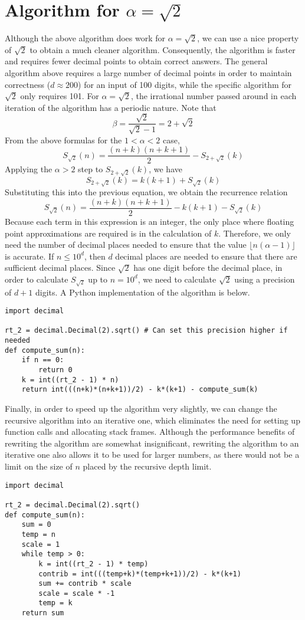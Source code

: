 \documentclass[oneside, 12pt]{article}
\begin{document}
\section*{Algorithm for $\alpha = \sqrt{2}$}
Although the above algorithm does work for $\alpha = \sqrt{2}$, we can use a nice property of $\sqrt{2}$ to obtain a much cleaner algorithm. Consequently, the algorithm is faster and requires fewer decimal points to obtain correct answers. The general algorithm above requires a large number of decimal points in order to maintain correctness ($d \approx 200$) for an input of 100 digits, while the specific algorithm for $\sqrt{2}$ only requires 101. For $\alpha = \sqrt{2}$, the irrational number passed around in each iteration of the algorithm has a periodic nature. Note that 
\[
\beta = \frac{\sqrt{2}}{\sqrt{2} - 1} = 2 + \sqrt{2}
\]
From the above formulas for the $1 < \alpha < 2$ case, 
\[
	S_{\sqrt{2}}(n) = \frac{(n + k)(n + k + 1)}{2} - S_{2 + \sqrt{2}}(k)
\]
Applying the $\alpha > 2$ step to $S_{2 + \sqrt{2}}(k)$, we have 
\[
	S_{2 + \sqrt{2}}(k) = k(k+1) + S_{\sqrt{2}}(k)
\]
Substituting this into the previous equation, we obtain the recurrence relation 
\[
	S_{\sqrt{2}}(n) = \frac{(n+k)(n+k+1)}{2} - k(k+1) - S_{\sqrt{2}}(k)
\]
Because each term in this expression is an integer, the only place where floating point approximations are required is in the calculation of $k$. Therefore, we only need the number of decimal places needed to ensure that the value $\lfloor n (\alpha - 1) \rfloor$ is accurate. If $n \le 10^{d}$, then $d$ decimal places are needed to ensure that there are sufficient decimal places. Since $\sqrt{2}$ has one digit before the decimal place, in order to calculate $S_{\sqrt{2}}$ up to $n = 10^{d}$, we need to calculate $\sqrt{2}$ using a precision of $d+1$ digits. A Python implementation of the algorithm is below.
\begin{lstlisting}
import decimal

rt_2 = decimal.Decimal(2).sqrt() # Can set this precision higher if needed
def compute_sum(n):
	if n == 0:
		return 0
	k = int((rt_2 - 1) * n)
	return int(((n+k)*(n+k+1))/2) - k*(k+1) - compute_sum(k)
\end{lstlisting}
Finally, in order to speed up the algorithm very slightly, we can change the recursive algorithm into an iterative one, which eliminates the need for setting up function calls and allocating stack frames. Although the performance benefits of rewriting the algorithm are somewhat insignificant, rewriting the algorithm to an iterative one also allows it to be used for larger numbers, as there would not be a limit on the size of $n$ placed by the recursive depth limit. 
\begin{lstlisting}
import decimal

rt_2 = decimal.Decimal(2).sqrt()
def compute_sum(n):
	sum = 0
	temp = n
	scale = 1
	while temp > 0:
		k = int((rt_2 - 1) * temp)
		contrib = int(((temp+k)*(temp+k+1))/2) - k*(k+1)
		sum += contrib * scale
		scale = scale * -1
		temp = k
	return sum
\end{lstlisting}
\end{document}

